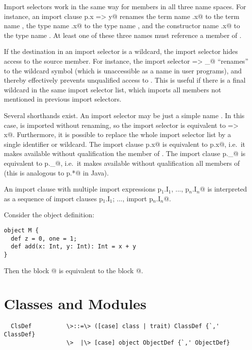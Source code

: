 \documentclass[11pt]{report}
\begin{document}
Import selectors work in the same way for members in all three name
spaces.  For instance, an import clause \verb@import p.{x => y}@
renames the term name \verb@p.x@ to the term name \verb@y@, the type
name \verb@p.x@ to the type name \verb@y@, and the constructor name
\verb@p.x@ to the type name \verb@y@. At least one of these three
names must reference a member of \verb@p@.

If the destination in an import selector is a wildcard, the import
selector hides access to the source member. For instance, the import
selector \verb@x => _@ ``renames'' \verb@x@ to the wildcard symbol
(which is unaccessible as a name in user programs), and thereby
effectively prevents unqualified access to \verb@x@. This is useful if
there is a final wildcard in the same import selector list, which
imports all members not mentioned in previous import selectors.

Several shorthands exist. An import selector may be just a simple name
\verb@x@. In this case, \verb@x@ is imported without renaming, so the
import selector is equivalent to \verb@x => x@. Furthermore, it is
possible to replace the whole import selector list by a single
identifier or wildcard. The import clause \verb@import p.x@ is
equivalent to \verb@import p.{x}@, i.e.\ it makes available without
qualification the member \verb@x@ of \verb@p@. The import clause
\verb@import p._@ is equivalent to
\verb@import p.{_}@, 
i.e.\ it makes available without qualification all members of \verb@p@
(this is analogous to \verb@import p.*@ in Java).

An import clause with multiple import expressions
\verb@import p$_1$.I$_1$, ..., p$_n$.I$_n$@ is interpreted as a
sequence of import clauses 
\verb@import p$_1$.I$_1$; ..., import p$_n$.I$_n$@.

\example Consider the object definition:
\begin{verbatim}
object M { 
  def z = 0, one = 1; 
  def add(x: Int, y: Int): Int = x + y 
}
\end{verbatim}
Then the block
@
is equivalent to the block @.

\chapter{Classes and Modules}
\label{sec:globaldefs}

\syntax\begin{verbatim}
  ClsDef          \>::=\> ([case] class | trait) ClassDef {`,' ClassDef}
                  \>  |\> [case] object ObjectDef {`,' ObjectDef}
\end{verbatim}
\end{document}
